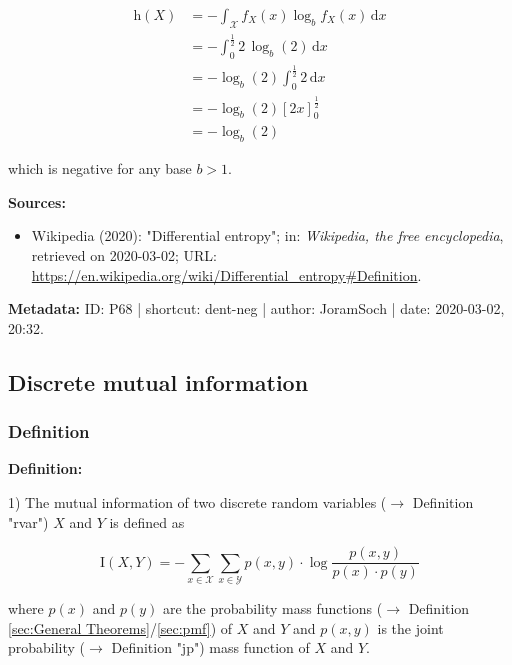 \documentclass[a4paper,12pt]{book}
\begin{document}
\begin{equation} \label{eq:dent-neg-X-dent}
\begin{split}
\mathrm{h}(X) &= - \int_{\mathcal{X}} f_X(x) \log_b f_X(x) \, \mathrm{d}x \\
&= - \int_{0}^{\frac{1}{2}} 2 \, \log_b(2) \, \mathrm{d}x \\
&= -\log_b(2) \int_{0}^{\frac{1}{2}} 2 \, \mathrm{d}x \\
&= -\log_b(2) \left[ 2x \right]_{0}^{\frac{1}{2}} \\
&= -\log_b(2)
\end{split}
\end{equation}

which is negative for any base $b > 1$.

\vspace{1em}
\textbf{Sources:}
\begin{itemize}
\item Wikipedia (2020): "Differential entropy"; in: \textit{Wikipedia, the free encyclopedia}, retrieved on 2020-03-02; URL: \url{https://en.wikipedia.org/wiki/Differential_entropy#Definition}.
\end{itemize}


\vspace{1em}
\textbf{Metadata:} ID: P68 | shortcut: dent-neg | author: JoramSoch | date: 2020-03-02, 20:32.


\subsection{Discrete mutual information}

\subsubsection[\textit{Definition}]{Definition} \label{sec:mi}

\vspace{1em}
\textbf{Definition:}

1) The mutual information of two discrete random variables ($\rightarrow$ Definition "rvar") $X$ and $Y$ is defined as

\begin{equation} \label{eq:mi-mi-disc}
\mathrm{I}(X,Y) = - \sum_{x \in \mathcal{X}} \sum_{x \in \mathcal{Y}} p(x,y) \cdot \log \frac{p(x,y)}{p(x) \cdot p(y)}
\end{equation}

where $p(x)$ and $p(y)$ are the probability mass functions ($\rightarrow$ Definition \ref{sec:General Theorems}/\ref{sec:pmf}) of $X$ and $Y$ and $p(x,y)$ is the joint probability ($\rightarrow$ Definition "jp") mass function of $X$ and $Y$.
\end{document}
